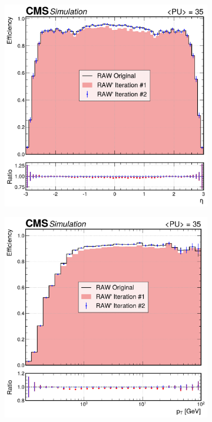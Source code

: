 \begin{figure}[h]
        \centering
        \begin{subfigure}[b]{0.49\textwidth}
            \centering
            \includegraphics[width=\textwidth]{Figures/Chapter5/efficiency_comparison_2_eta.pdf}
            \caption{}
        \end{subfigure}
        \begin{subfigure}[b]{0.49\textwidth}
            \centering
            \includegraphics[width=\textwidth]{Figures/Chapter5/efficiency_comparison_2_pt.pdf}
            \caption{}
        \end{subfigure}


\end{figure}
